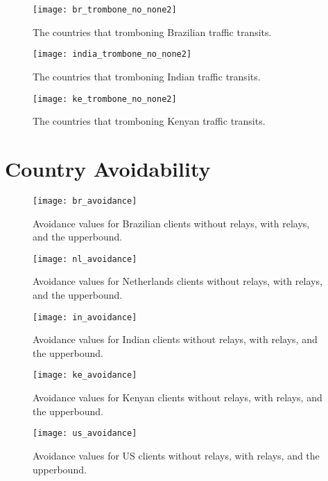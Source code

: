 \begin{figure}
\centering
\texttt{[image: br\_trombone\_no\_none2]}
\caption{The countries that tromboning Brazilian traffic transits.}
\label{fig:trombone_br}
\end{figure}

\begin{figure}
\centering
\texttt{[image: india\_trombone\_no\_none2]}
\caption{The countries that tromboning Indian traffic transits.}
\label{fig:trombone_in}
\end{figure}

\begin{figure}
\centering
\texttt{[image: ke\_trombone\_no\_none2]}
\caption{The countries that tromboning Kenyan traffic transits.}
\label{fig:trombone_ke}
\end{figure}

\section{Country Avoidability}

\begin{figure}
\centering
\texttt{[image: br\_avoidance]}
\caption{Avoidance values for Brazilian clients without relays, with relays, and the upperbound.}
\label{fig:br_avoidance}
\end{figure}

\begin{figure}
\centering
\texttt{[image: nl\_avoidance]}
\caption{Avoidance values for Netherlands clients without relays, with relays, and the upperbound.}
\label{fig:nl_avoidance}
\end{figure}

\begin{figure}
\centering
\texttt{[image: in\_avoidance]}
\caption{Avoidance values for Indian clients without relays, with relays, and the upperbound.}
\label{fig:in_avoidance}
\end{figure}

\begin{figure}
\centering
\texttt{[image: ke\_avoidance]}
\caption{Avoidance values for Kenyan clients without relays, with relays, and the upperbound.}
\label{fig:ke_avoidance}
\end{figure}

\begin{figure}
\centering
\texttt{[image: us\_avoidance]}
\caption{Avoidance values for US clients without relays, with relays, and the upperbound.}
\label{fig:us_avoidance}
\end{figure}
